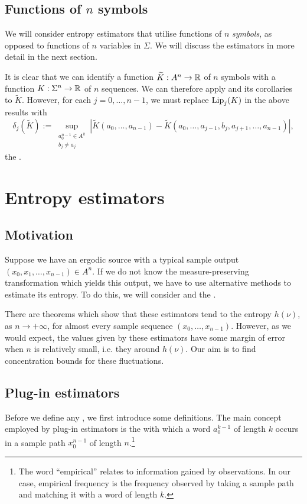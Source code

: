 \subsection{Functions of \texorpdfstring{$n$}{n} symbols}
We will consider entropy estimators that utilise functions of $n$ \emph{symbols}, as opposed to functions of $n$ variables in $\Sigma$. We will discuss the estimators in more detail in the next section.

It is clear that we can identify a function $\widetilde{K} : A^n \to \mathbb{R}$ of $n$ symbols with a function $K : \Sigma^n \to \mathbb{R}$ of $n$ sequences. We can therefore apply  and its corollaries to $\tilde{K}$. However, for each $j = 0, \dots, n - 1$, we must replace $\operatorname{Lip}_j(K)$ in the above results with
\[
	\delta_j(\tilde{K}) := \sup_{\substack{a_0^{n - 1} \in A^k \\ b_j \neq a_j}}{|\tilde{K}(a_0, \dots, a_{n - 1}) - \tilde{K}(a_0, \dots, a_{j - 1}, b_j, a_{j + 1}, \dots, a_{n - 1})|},
\]
the .

\section{Entropy estimators}\label{sec:estimator-bounds}
\subsection{Motivation}
Suppose we have an ergodic source with a typical sample output $(x_0, x_1, \dots, x_{n - 1}) \in A^n$. If we do not know the measure-preserving transformation which yields this output, we have to use alternative methods to estimate its entropy. To do this, we will consider  and the .

There are theorems which show that these estimators tend to the entropy $h(\nu)$, as $n \to +\infty$, for almost every sample sequence $(x_0, \dots, x_{n - 1})$. However, as we would expect, the values given by these estimators have some margin of error when $n$ is relatively small, i.e. they  around $h(\nu)$. Our aim is to find concentration bounds for these fluctuations.

\subsection{Plug-in estimators}
Before we define any , we first introduce some definitions. The main concept employed by plug-in estimators is the  with which a word $a_0^{k - 1}$ of length $k$ occurs in a sample path $x_0^{n - 1}$ of length $n$.\footnote{The word ``empirical'' relates to information gained by observations. In our case, empirical frequency is the frequency observed by taking a sample path and matching it with a word of length $k$.}

